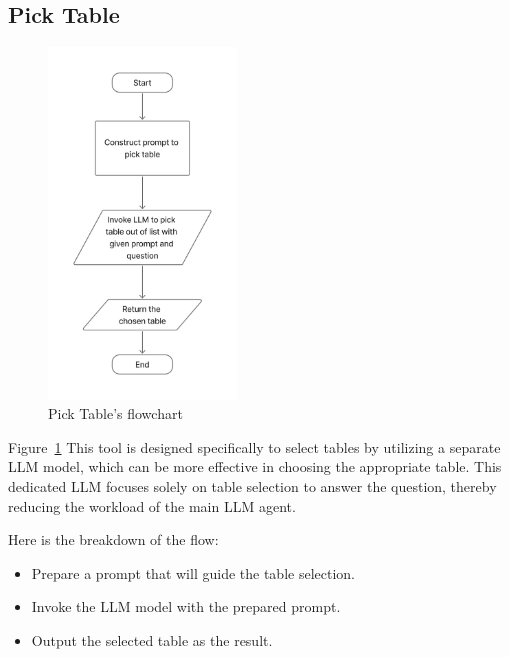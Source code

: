     \subsection{Pick Table}
    \label{sec:pick_table}
    \begin{figure}[H]
        \centering
        \includegraphics[width=5cm]{chapters/3/figures/pick_table.jpg}
        \caption[Pick Table tool’s flowchart]{Pick Table’s flowchart}
        \label{fig:pick_table}
    \end{figure}
    Figure~\ref{fig:pick_table} This tool is designed specifically to select tables by utilizing a separate LLM model, which can be more effective in choosing the appropriate table. This dedicated LLM focuses solely on table selection to answer the question, thereby reducing the workload of the main LLM agent.

    Here is the breakdown of the flow:
    \begin{itemize}
        \item  Prepare a prompt that will guide the table selection.
        \item  Invoke the LLM model with the prepared prompt.
        \item  Output the selected table as the result.
    \end{itemize}

